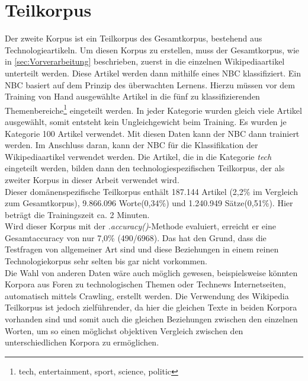 \documentclass[12pt,a4paper]{report}
\begin{document}
	\section{Teilkorpus}
	\label{sec:Teilkorpus}	
	Der zweite Korpus ist ein Teilkorpus des Gesamtkorpus, bestehend aus Technologieartikeln. Um diesen Korpus zu erstellen, muss der Gesamtkorpus, wie in \ref{sec:Vorverarbeitung} beschrieben, zuerst in die einzelnen Wikipediaartikel unterteilt werden. Diese Artikel werden dann mithilfe eines NBC klassifiziert. Ein NBC basiert auf dem Prinzip des überwachten Lernens. Hierzu müssen vor dem Training von Hand ausgewählte Artikel in die fünf zu klassifizierenden Themenbereiche\footnote{tech, entertainment, sport, science, politic} eingeteilt werden. In jeder Kategorie wurden gleich viele Artikel ausgewählt, somit entsteht kein Ungleichgewicht beim Training. Es wurden je Kategorie 100 Artikel verwendet. Mit diesen Daten kann der NBC dann trainiert werden. Im Anschluss daran, kann der NBC für die Klassifikation der Wikipediaartikel verwendet werden. Die Artikel, die in die Kategorie \textit{tech} eingeteilt werden, bilden dann den technologiespezifischen Teilkorpus, der als zweiter Korpus in dieser Arbeit verwendet wird.\\
	
	
	Dieser domänenspezifische Teilkorpus enthält 187.144 Artikel (2,2\% im Vergleich zum Gesamtkorpus), 9.866.096 Worte(0,34\%) und 1.240.949 Sätze(0,51\%). Hier beträgt die Trainingszeit ca. 2 Minuten.\\
	Wird dieser Korpus mit der \textit{.accuracy()}-Methode evaluiert, erreicht er eine Gesamtaccuracy von nur 7,0\% (490/6968). Das hat den Grund, dass die Testfragen von allgemeiner Art sind und diese Beziehungen in einem reinen Technologiekorpus sehr selten bis gar nicht vorkommen.\\
	

	Die Wahl von anderen Daten wäre auch möglich gewesen, beispielsweise könnten Korpora aus Foren zu technologischen Themen oder Technews Internetseiten, automatisch mittels Crawling, erstellt werden. Die Verwendung des Wikipedia Teilkorpus ist jedoch zielführender, da hier die gleichen Texte in beiden Korpora vorhanden sind und somit auch die gleichen Beziehungen zwischen den einzelnen Worten, um so einen möglichst objektiven Vergleich zwischen den unterschiedlichen Korpora zu ermöglichen.\\
	
	
\end{document}
